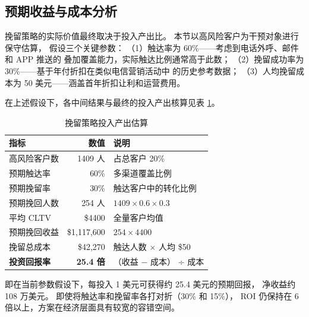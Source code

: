 \subsection{预期收益与成本分析}

挽留策略的实际价值最终取决于投入产出比。
本节以高风险客户为干预对象进行保守估算，
假设三个关键参数：
（1）触达率为 60\%——考虑到电话外呼、邮件和 APP 推送的
叠加覆盖能力，实际触达比例通常高于此数；
（2）挽留成功率为 30\%——基于年付折扣在类似电信营销活动中
的历史参考数据；
（3）人均挽留成本为 50 美元——涵盖首年折扣让利和运营费用。

在上述假设下，各中间结果与最终的投入产出核算见表 \ref{tab:roi}。

\begin{table}[H]
    \centering
    \caption{挽留策略投入产出估算}
    \label{tab:roi}
    \small
    \begin{tabular}{lrl}
        \toprule
        指标 & 数值 & 说明 \\
        \midrule
        高风险客户数 & 1409 人 & 占总客户 20\% \\
        预期触达率 & 60\% & 多渠道覆盖比例 \\
        预期挽留率 & 30\% & 触达客户中的转化比例 \\
        预期挽回人数 & 254 人 & $1409 \times 0.6 \times 0.3$ \\
        平均 CLTV & \$4400 & 全量客户均值 \\
        预期挽回收益 & \$1,117,600 & $254 \times 4400$ \\
        挽留总成本 & \$42,270 & 触达人数 $\times$ 人均 \$50 \\
        \textbf{投资回报率} & \textbf{25.4 倍} & （收益 $-$ 成本） ÷ 成本 \\
        \bottomrule
    \end{tabular}
\end{table}

即在当前参数假设下，每投入 1 美元可获得约 25.4 美元的预期回报，
净收益约 108 万美元。
即使将触达率和挽留率各打对折（30\% 和 15\%），
ROI 仍保持在 6 倍以上，方案在经济层面具有较宽的容错空间。
